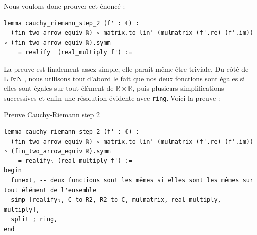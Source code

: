 \documentclass[a4paper, 11pt, twoside]{report}
\newcommand\R{\mathbb{R}}
\newcommand{\LEAN}{L$\exists\forall$N }
\begin{document}
Nous voulons donc prouver cet énoncé :

\begin{lstlisting}
lemma cauchy_riemann_step_2 (f' : ℂ) : 
  (fin_two_arrow_equiv ℝ) ∘ matrix.to_lin' (mulmatrix (f'.re) (f'.im)) ∘ (fin_two_arrow_equiv ℝ).symm 
    = realifyₗ (real_multiply f') :=
\end{lstlisting}

La preuve est finalement assez simple, elle parait même être triviale. Du côté de \LEAN, nous utilisons tout d'abord le fait que nos deux fonctions sont égales si elles sont égales sur tout élément de $\R\times\R$, puis plusieurs simplifications successives et enfin une résolution évidente avec \verb|ring|. Voici la preuve :

\begin{code}{Preuve Cauchy-Riemann step 2}
\begin{lstlisting}
lemma cauchy_riemann_step_2 (f' : ℂ) : 
  (fin_two_arrow_equiv ℝ) ∘ matrix.to_lin' (mulmatrix (f'.re) (f'.im)) ∘ (fin_two_arrow_equiv ℝ).symm 
    = realifyₗ (real_multiply f') :=
begin
  funext, -- deux fonctions sont les mêmes si elles sont les mêmes sur tout élément de l'ensemble
  simp [realifyₗ, C_to_R2, R2_to_C, mulmatrix, real_multiply, multiply],
  split ; ring,
end
\end{lstlisting}
\end{code}
\end{document}
